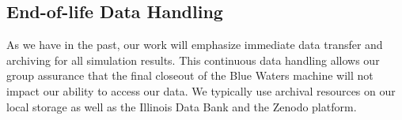 \documentclass[letterpaper]{article}
\begin{document}
 


\subsection{End-of-life Data Handling}
As we have in the past, our work will emphasize immediate data transfer and 
archiving for all simulation results. This continuous data handling allows our 
group assurance that the final closeout of the Blue Waters machine will not 
impact our ability to access our data. We typically use archival resources on 
our local storage as well as the Illinois Data Bank and the Zenodo platform. 

\pagebreak


\end{document}
